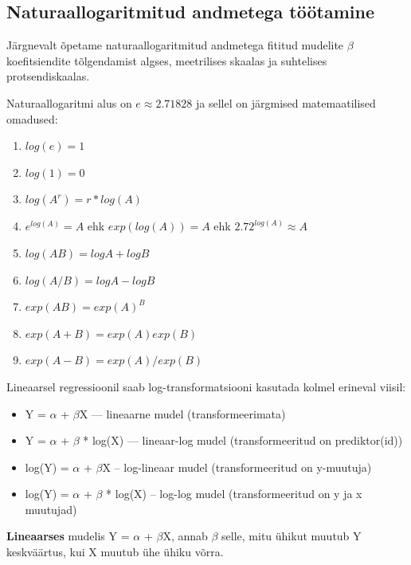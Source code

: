 \documentclass[]{book}
\begin{document}
\subsection*{Naturaallogaritmitud andmetega
töötamine}\label{naturaallogaritmitud-andmetega-tootamine}

Järgnevalt õpetame naturaallogaritmitud andmetega fititud mudelite
\(\beta\) koefitsiendite tõlgendamist algses, meetrilises skaalas ja
suhtelises protsendiskaalas.

Naturaallogaritmi alus on \(e \approx 2.71828\) ja sellel on järgmised
matemaatilised omadused:

\begin{enumerate}
\def\labelenumi{\arabic{enumi}.}
\item
  \(log(e) = 1\)
\item
  \(log(1) = 0\)
\item
  \(log(A^r) = r * log(A)\)
\item
  \(e^{log(A)} = A\) ehk \(exp(log(A)) = A\) ehk
  \(2.72^{log(A)} \approx A\)
\item
  \(log(AB)=logA + logB\)
\item
  \(log(A/B)=logA - logB\)
\item
  \(exp(AB) = exp(A)^B\)
\item
  \(exp(A+B) = exp(A)exp(B)\)
\item
  \(exp(A-B) = exp(A)/exp(B)\)
\end{enumerate}

Lineaarsel regressioonil saab log-transformatsiooni kasutada kolmel
erineval viisil:

\begin{itemize}
\item
  Y = \(\alpha\) + \(\beta\)X --- lineaarne mudel (transformeerimata)
\item
  Y = \(\alpha\) + \(\beta\) * log(X) --- lineaar-log mudel
  (transformeeritud on prediktor(id))
\item
  log(Y) = \(\alpha\) + \(\beta\)X -- log-lineaar mudel
  (transformeeritud on y-muutuja)
\item
  log(Y) = \(\alpha\) + \(\beta\) * log(X) -- log-log mudel
  (transformeeritud on y ja x muutujad)
\end{itemize}

\textbf{Lineaarses} mudelis Y = \(\alpha\) + \(\beta\)X, annab \(\beta\)
selle, mitu ühikut muutub Y keskväärtus, kui X muutub ühe ühiku võrra.
\end{document}
